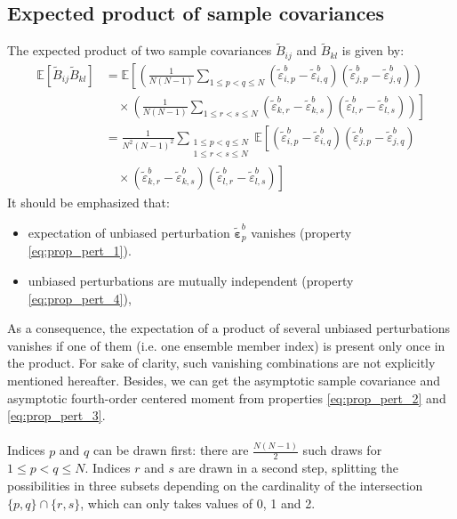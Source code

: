 \documentclass[12pt]{scrartcl}
\begin{document}
\subsection{Expected product of sample covariances}
The expected product of two sample covariances $\widetilde{B}_{ij}$ and $\widetilde{B}_{kl}$ is given by:
\begin{align}
\mathbb{E} \left[\widetilde{B}_{ij} \widetilde{B}_{kl}\right] & = \mathbb{E}\left[\left(\frac{1}{N(N-1)} \sum_{1 \le p < q \le N} \left(\widetilde{\varepsilon}^b_{i,p} - \widetilde{\varepsilon}^b_{i,q}\right) \left(\widetilde{\varepsilon}^b_{j,p} - \widetilde{\varepsilon}^b_{j,q}\right)\right) \right. \nonumber \\
& \left. \quad \times \left(\frac{1}{N(N-1)} \sum_{1 \le r < s \le N} \left(\widetilde{\varepsilon}^b_{k,r} - \widetilde{\varepsilon}^b_{k,s}\right) \left(\widetilde{\varepsilon}^b_{l,r} - \widetilde{\varepsilon}^b_{l,s}\right)\right) \right] \nonumber \\
& = \frac{1}{N^2(N-1)^2} \sum_{\substack{1 \le p < q \le N\\1 \le r < s \le N}} \mathbb{E}\left[\left(\widetilde{\varepsilon}^b_{i,p} - \widetilde{\varepsilon}^b_{i,q}\right) \left(\widetilde{\varepsilon}^b_{j,p} - \widetilde{\varepsilon}^b_{j,q}\right) \right. \nonumber \\
& \left. \quad \times \left(\widetilde{\varepsilon}^b_{k,r} - \widetilde{\varepsilon}^b_{k,s}\right) \left(\widetilde{\varepsilon}^b_{l,r} - \widetilde{\varepsilon}^b_{l,s}\right) \right]
\end{align}
It should be emphasized that:
\begin{itemize}
\item expectation of unbiased perturbation $\widetilde{\boldsymbol{\varepsilon}}^b_p$ vanishes (property \eqref{eq:prop_pert_1}).
\item unbiased perturbations are mutually independent (property \eqref{eq:prop_pert_4}),
\end{itemize}
As a consequence, the expectation of a product of several unbiased perturbations vanishes if one of them (i.e. one ensemble member index) is present only once in the product. For sake of clarity, such vanishing combinations are not explicitly mentioned hereafter. Besides, we can get the asymptotic sample covariance and asymptotic fourth-order centered moment from properties \eqref{eq:prop_pert_2} and \eqref{eq:prop_pert_3}.\\
$  $\\
Indices $p$ and $q$ can be drawn first: there are $\displaystyle \frac{N(N-1)}{2}$ such draws for $1 \le p < q \le N$. Indices $r$ and $s$ are drawn in a second step, splitting the possibilities in three subsets depending on the cardinality of the intersection $\{p,q\} \cap \{r,s\}$, which can only takes values of 0, 1 and 2.
\end{document}
